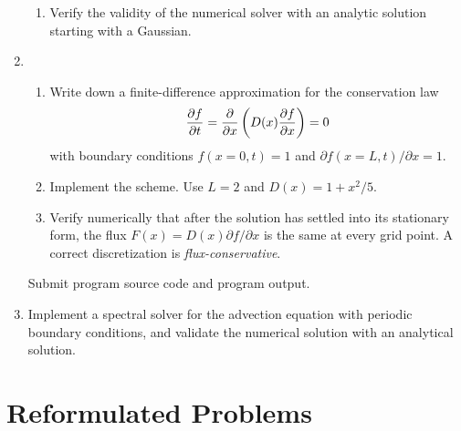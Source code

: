 \documentclass{article}
\begin{document}
\begin{enumerate}
\begin{enumerate}
\item
  Verify the validity of the numerical solver with an analytic solution starting with a Gaussian.

\end{enumerate}


\item
  \begin{enumerate}\setlength{\itemsep}{0pt}
    \item
  Write down a finite-difference approximation for the conservation law
  \[
  {\partial f \over \partial t} = {\partial \over \partial x} \left( D(x) {\partial f \over \partial x} \right) = 0 
  \]
  with boundary conditions $f(x=0,t)=1$ and $\partial f(x=L,t)/\partial x = 1$.

  \item
    Implement the scheme. Use $L=2$ and $D(x)=1+x^2/5$.

  \item Verify numerically that after the solution has settled into its stationary form, the flux $F(x) = D(x)\partial f/\partial x$ is the same at every grid point.  A correct discretization is {\it flux-conservative}.

  \end{enumerate}
Submit program source code and program output.
  
  \item Implement a spectral solver for the advection equation with periodic boundary conditions, and validate the numerical solution with an analytical solution.


\end{enumerate}





\section{Reformulated Problems}
\label{chap:reform}
\end{document}
